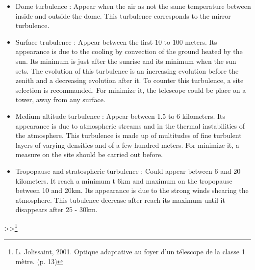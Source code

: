 \begin{itemize}
    \item Dome turbulence : \newline Appear when the air as not the same temperature between inside and outside the dome. This turbulence corresponds to
          the mirror turbulence.
    \item Surface trubulence : \newline Appear between the first 10 to 100 meters. Its appearance is due to the cooling by convection of the ground
          heated by the sun. Its minimum is just after the sunrise and its minimum when the sun sets. The evolution of this turbulence is an increasing
          evolution before the zenith and a decreasing evolution after it.\newline
          To counter this turbulence, a site selection is recommanded. For minimize it, the telescope could be place on a tower, away from any surface.
    \item Medium altitude turbulence : \newline Appear between 1.5 to 6 kilometers. Its appearance is due to atmospheric streams and in the thermal
          instabilities of the atmosphere. This turbulence is made up of multitudes of fine turbulent layers of varying densities and of a few hundred
          meters. For minimize it, a measure on the site should be carried out before.
    \item Tropopause and stratospheric turbulence : \newline Could appear between 6 and 20 kilometers. It reach a minimum t 6km and maximum on the
          tropopause between 10 and 20km. Its appearance is due to the strong winds shearing the atmosphere. This tubulence decrease after reach its maximum
          until it disappears after 25 - 30km.
\end{itemize}>>\footnote{\cite{JOLISSAINT_master} L. Jolissaint, 2001. Optique adaptative au foyer d'un télescope de la classe 1 mètre. (p. 13)}

